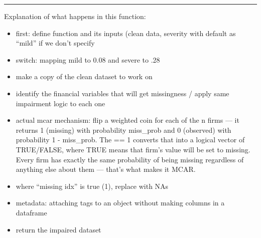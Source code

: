 \documentclass[
]{article}
\providecommand{\tightlist}{%
  \setlength{\itemsep}{0pt}\setlength{\parskip}{0pt}}
\begin{document}
\begin{center}\rule{0.5\linewidth}{0.5pt}\end{center}

Explanation of what happens in this function:

\begin{itemize}
\tightlist
\item
  first: define function and its inputs (clean data, severity with
  default as ``mild'' if we don't specify
\item
  switch: mapping mild to 0.08 and severe to .28
\item
  make a copy of the clean dataset to work on
\item
  identify the financial variables that will get missingness / apply
  same impairment logic to each one
\item
  actual mcar mechanism: flip a weighted coin for each of the n firms
  --- it returns 1 (missing) with probability miss\_prob and 0
  (observed) with probability 1 - miss\_prob. The == 1 converts that
  into a logical vector of TRUE/FALSE, where TRUE means that firm's
  value will be set to missing. Every firm has exactly the same
  probability of being missing regardless of anything else about them
  --- that's what makes it MCAR.
\item
  where ``missing idx'' is true (1), replace with NAs
\item
  metadata: attaching tags to an object without making columns in a
  dataframe
\item
  return the impaired dataset
\end{itemize}
\end{document}
